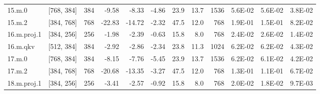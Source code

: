 \begin{table}
\begin{tabular}{llrrrrrrrrrr}
15.m.0 & [768, 384] & 384 & {\cellcolor[HTML]{FFFBB8}} \color[HTML]{000000} -9.58 & {\cellcolor[HTML]{FFFDBC}} \color[HTML]{000000} -8.33 & {\cellcolor[HTML]{F7FCB4}} \color[HTML]{000000} -4.86 & 23.9 & 13.7 & 1536 & {\cellcolor[HTML]{FFFEBE}} \color[HTML]{000000} 5.6E-02 & {\cellcolor[HTML]{FFFEBE}} \color[HTML]{000000} 5.6E-02 & {\cellcolor[HTML]{E8F59F}} \color[HTML]{000000} 3.8E-02 \\
15.m.2 & [384, 768] & 768 & {\cellcolor[HTML]{FEDA86}} \color[HTML]{000000} -22.83 & {\cellcolor[HTML]{FEEFA3}} \color[HTML]{000000} -14.72 & {\cellcolor[HTML]{EFF8AA}} \color[HTML]{000000} -2.32 & 47.5 & 12.0 & 768 & {\cellcolor[HTML]{C01A27}} \color[HTML]{F1F1F1} 1.9E-01 & {\cellcolor[HTML]{EC5C3B}} \color[HTML]{F1F1F1} 1.5E-01 & {\cellcolor[HTML]{FEE491}} \color[HTML]{000000} 8.2E-02 \\
16.m.proj.1 & [384, 256] & 256 & {\cellcolor[HTML]{EFF8AA}} \color[HTML]{000000} -1.98 & {\cellcolor[HTML]{F1F9AC}} \color[HTML]{000000} -2.39 & {\cellcolor[HTML]{EBF7A3}} \color[HTML]{000000} -0.63 & 15.8 & 8.0 & 768 & {\cellcolor[HTML]{D5ED88}} \color[HTML]{000000} 2.4E-02 & {\cellcolor[HTML]{D9EF8B}} \color[HTML]{000000} 2.6E-02 & {\cellcolor[HTML]{C3E67D}} \color[HTML]{000000} 1.4E-02 \\
16.m.qkv & [512, 384] & 384 & {\cellcolor[HTML]{F2FAAE}} \color[HTML]{000000} -2.92 & {\cellcolor[HTML]{F1F9AC}} \color[HTML]{000000} -2.86 & {\cellcolor[HTML]{EFF8AA}} \color[HTML]{000000} -2.34 & 23.8 & 11.3 & 1024 & {\cellcolor[HTML]{FFF8B4}} \color[HTML]{000000} 6.2E-02 & {\cellcolor[HTML]{FFF8B4}} \color[HTML]{000000} 6.2E-02 & {\cellcolor[HTML]{EEF8A8}} \color[HTML]{000000} 4.3E-02 \\
17.m.0 & [768, 384] & 384 & {\cellcolor[HTML]{FFFEBE}} \color[HTML]{000000} -8.15 & {\cellcolor[HTML]{FFFEBE}} \color[HTML]{000000} -7.76 & {\cellcolor[HTML]{F8FCB6}} \color[HTML]{000000} -5.45 & 23.9 & 13.7 & 1536 & {\cellcolor[HTML]{FFF8B4}} \color[HTML]{000000} 6.2E-02 & {\cellcolor[HTML]{FFFAB6}} \color[HTML]{000000} 6.1E-02 & {\cellcolor[HTML]{EEF8A8}} \color[HTML]{000000} 4.2E-02 \\
17.m.2 & [384, 768] & 768 & {\cellcolor[HTML]{FEE18D}} \color[HTML]{000000} -20.68 & {\cellcolor[HTML]{FFF2AA}} \color[HTML]{000000} -13.35 & {\cellcolor[HTML]{F2FAAE}} \color[HTML]{000000} -3.27 & 47.5 & 12.0 & 768 & {\cellcolor[HTML]{F88C51}} \color[HTML]{F1F1F1} 1.3E-01 & {\cellcolor[HTML]{FDAF62}} \color[HTML]{000000} 1.1E-01 & {\cellcolor[HTML]{FFF2AA}} \color[HTML]{000000} 6.7E-02 \\
18.m.proj.1 & [384, 256] & 256 & {\cellcolor[HTML]{F2FAAE}} \color[HTML]{000000} -3.41 & {\cellcolor[HTML]{F1F9AC}} \color[HTML]{000000} -2.57 & {\cellcolor[HTML]{ECF7A6}} \color[HTML]{000000} -0.92 & 15.8 & 8.0 & 768 & {\cellcolor[HTML]{CDEA83}} \color[HTML]{000000} 2.0E-02 & {\cellcolor[HTML]{C9E881}} \color[HTML]{000000} 1.8E-02 & {\cellcolor[HTML]{BBE278}} \color[HTML]{000000} 9.7E-03 \\

\end{tabular}
\end{table}

